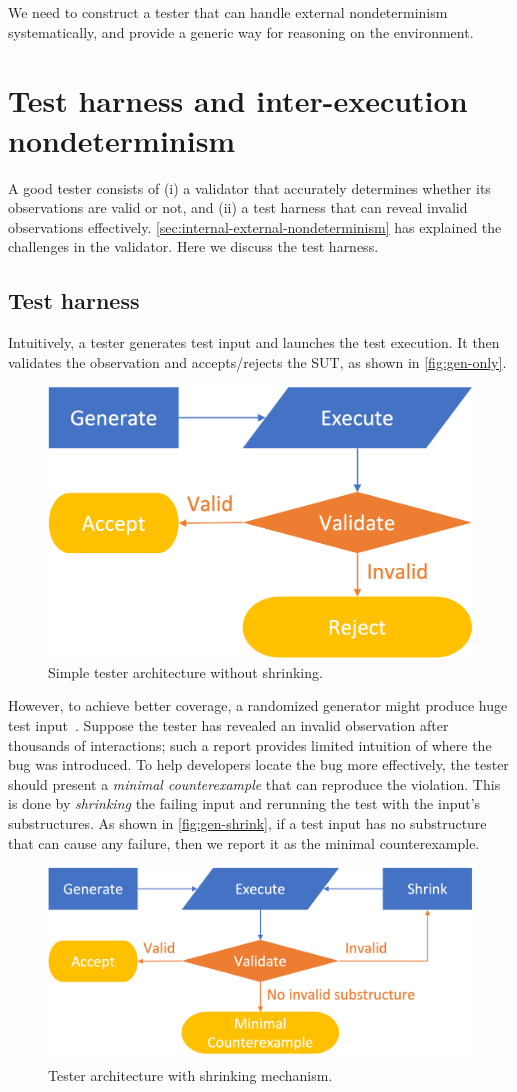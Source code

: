 We need to construct a tester that can handle external nondeterminism
systematically, and provide a generic way for reasoning on the environment.

\section{Test harness and inter-execution nondeterminism}
\label{sec:inter-execution-nondeterminism}
A good tester consists of (i) a validator that accurately determines whether its
observations are valid or not, and (ii) a test harness that can reveal invalid
observations effectively.  \autoref{sec:internal-external-nondeterminism} has
explained the challenges in the validator.  Here we discuss the test harness.

\subsection{Test harness}
Intuitively, a tester generates test input and launches the test execution.  It
then validates the observation and accepts/rejects the SUT, as shown in
\autoref{fig:gen-only}.
\begin{figure}
  \includegraphics[width=.5\linewidth]{figures/gen-only}
  \caption{Simple tester architecture without shrinking.}
  \label{fig:gen-only}
\end{figure}

However, to achieve better coverage, a randomized generator might produce huge
test input~\cite{Hughes2016}.  Suppose the tester has revealed an invalid
observation after thousands of interactions; such a report provides limited
intuition of where the bug was introduced.  To help developers locate the bug
more effectively, the tester should present a {\em minimal counterexample} that
can reproduce the violation.  This is done by {\em shrinking} the failing input
and rerunning the test with the input's substructures.  As shown
in \autoref{fig:gen-shrink}, if a test input has no substructure that can cause
any failure, then we report it as the minimal counterexample.
\begin{figure}
  \includegraphics[width=.8\linewidth]{figures/gen-shrink}
  \caption{Tester architecture with shrinking mechanism.}
  \label{fig:gen-shrink}
\end{figure}

